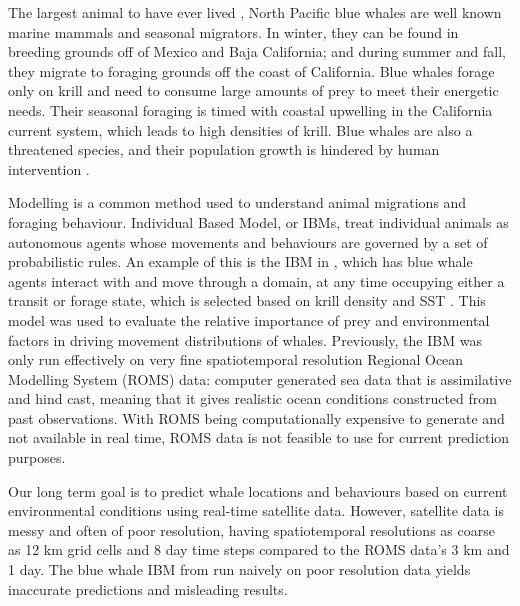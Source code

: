 \documentclass[11pt]{article}
\begin{document}
The largest animal to have ever lived \cite{whale1}, North Pacific blue whales are well known marine mammals and seasonal migrators. In winter, they can be found in breeding grounds off of Mexico and Baja California; and during summer and fall, they migrate to foraging grounds off the coast of California. Blue whales forage only on krill and need to consume large amounts of prey to meet their energetic needs. Their seasonal foraging is timed with coastal upwelling in the California current system, which leads to high densities of krill. Blue whales are also a threatened species, and their population growth is hindered by human intervention \cite{whale1}. \par

Modelling is a common method used to understand animal migrations and foraging behaviour. Individual Based Model, or IBMs, treat individual animals as autonomous agents whose movements and behaviours are governed by a set of probabilistic rules. An example of this is the IBM in \cite{Dodson}, which has blue whale agents interact with and move through a domain, at any time occupying either a transit or forage state, which is selected based on krill density and SST \cite{Dodson}. This model was used to evaluate the relative importance of prey and environmental factors in driving movement distributions of whales. Previously, the IBM was only run effectively on very fine spatiotemporal resolution Regional Ocean Modelling System (ROMS) data: computer generated sea data that is assimilative and hind cast, meaning that it gives realistic ocean conditions constructed from past observations. With ROMS being computationally expensive to generate and not available in real time, ROMS data is not feasible to use for current prediction purposes. \par

Our long term goal is to predict whale locations and behaviours based on current environmental conditions using real-time satellite data. However, satellite data is messy and often of poor resolution, having spatiotemporal resolutions as coarse as 12 km grid cells and 8 day time steps compared to the ROMS data’s 3 km and 1 day. The blue whale IBM from \cite{Dodson} run naively on poor resolution data yields inaccurate predictions and misleading results.  \par
\end{document}
